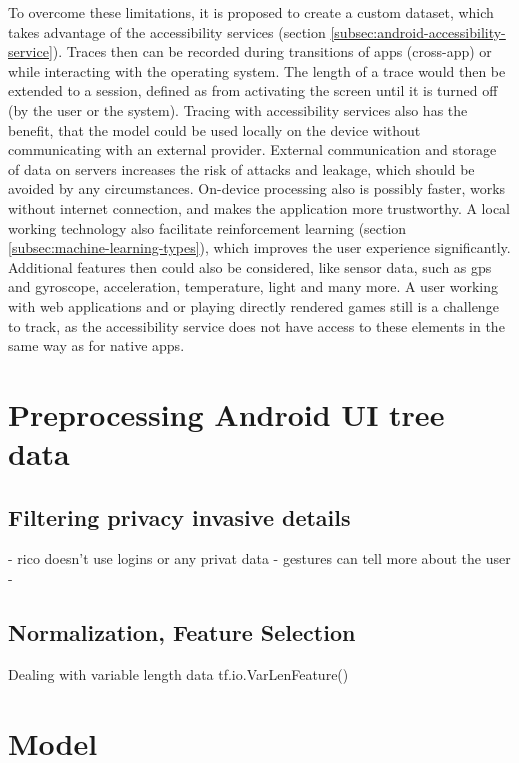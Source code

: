 To overcome these limitations, it is proposed to create a custom dataset, which takes advantage of the accessibility services (section \ref{subsec:android-accessibility-service}).
Traces then can be recorded during transitions of apps (cross-app) or while interacting with the operating system.
The length of a trace would then be extended to a session, defined as from activating the screen until it is turned off (by the user or the system).
Tracing with accessibility services also has the benefit, that the model could be used locally on the device without communicating with an external provider.
External communication and storage of data on servers increases the risk of attacks and leakage, which should be avoided by any circumstances.
On-device processing also is possibly faster, works without internet connection, and makes the application more trustworthy.
A local working technology also facilitate reinforcement learning (section \ref{subsec:machine-learning-types}), which improves the user experience significantly.
Additional features then could also be considered, like sensor data, such as \gls{gps} and gyroscope, acceleration, temperature, light and many more.
A user working with web applications and or playing directly rendered games still is a challenge to track, as the accessibility service does not have access to these elements in the same way as for native apps.


\section{Preprocessing Android UI tree data}
\subsection{Filtering privacy invasive details}

- rico doesn't use logins or any privat data
- gestures can tell more about the user
-


\subsection{Normalization, Feature Selection}

Dealing with variable length data tf.io.VarLenFeature()

\section{Model}

